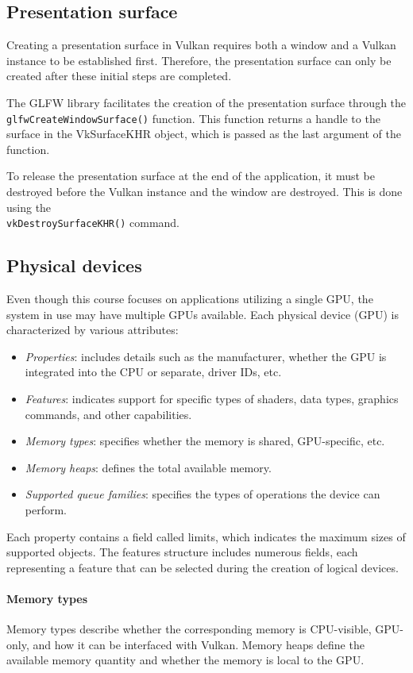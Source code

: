 \subsection{Presentation surface}
Creating a presentation surface in Vulkan requires both a window and a Vulkan instance to be established first. 
Therefore, the presentation surface can only be created after these initial steps are completed.

The GLFW library facilitates the creation of the presentation surface through the \\\texttt{glfwCreateWindowSurface()} function. 
This function returns a handle to the surface in the VkSurfaceKHR object, which is passed as the last argument of the function.

To release the presentation surface at the end of the application, it must be destroyed before the Vulkan instance and the window are destroyed. 
This is done using the \\\texttt{vkDestroySurfaceKHR()} command.

\subsection{Physical devices}
Even though this course focuses on applications utilizing a single GPU, the system in use may have multiple GPUs available. Each physical device (GPU) is characterized by various attributes:
\begin{itemize}
    \item \textit{Properties}: includes details such as the manufacturer, whether the GPU is integrated into the CPU or separate, driver IDs, etc.
    \item \textit{Features}: indicates support for specific types of shaders, data types, graphics commands, and other capabilities.
    \item \textit{Memory types}: specifies whether the memory is shared, GPU-specific, etc.
    \item \textit{Memory heaps}: defines the total available memory.
    \item \textit{Supported queue families}: specifies the types of operations the device can perform.
\end{itemize}
Each property contains a field called limits, which indicates the maximum sizes of supported objects. 
The features structure includes numerous fields, each representing a feature that can be selected during the creation of logical devices.

\paragraph*{Memory types}
Memory types describe whether the corresponding memory is CPU-visible, GPU-only, and how it can be interfaced with Vulkan. 
Memory heaps define the available memory quantity and whether the memory is local to the GPU.

